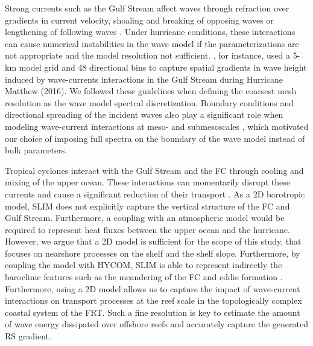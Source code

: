 Strong currents such as the Gulf Stream affect waves through refraction over gradients in current velocity, shoaling and breaking of opposing waves or lengthening of following waves \citep{hegermiller2019wave}. Under hurricane conditions, these interactions can cause numerical instabilities in the wave model if the parameterizations are not appropriate and the model resolution not sufficient. \cite{hegermiller2019wave}, for instance, used a 5-km model grid and 48 directional bins to capture spatial gradients in wave height induced by wave-currents interactions in the Gulf Stream during Hurricane Matthew (2016). We followed these guidelines when defining the coarsest mesh resolution as the wave model spectral discretization. Boundary conditions and directional spreading of the incident waves also play a significant role when modeling wave-current interactions at meso- and submesoscales \citep{villas2020wave}, which motivated our choice of imposing full spectra on the boundary of the wave model instead of bulk parameters.

Tropical cyclones interact with the Gulf Stream and the FC through cooling and mixing of the upper ocean. These interactions can momentarily disrupt these currents and cause a significant reduction of their transport \citep{oey2007hurricane,ezer2017observations,ezer2020long}. As a 2D barotropic model, SLIM does not explicitly capture the vertical structure of the FC and Gulf Stream. Furthermore, a coupling with an atmospheric model would be required to represent heat fluxes between the upper ocean and the hurricane. However, we argue that a 2D model is sufficient for the scope of this study, that focuses on nearshore processes on the shelf and the shelf slope. Furthermore, by coupling the model with HYCOM, SLIM is able to represent indirectly the baroclinic features such as the meandering of the FC and eddie formation \citep{frys2020fine}. Furthermore, using a 2D model allows us to capture the impact of wave-current interactions on transport processes at the reef scale in the topologically complex coastal system of the FRT. Such a fine resolution is key to estimate the amount of wave energy dissipated over offshore reefs and accurately capture the generated RS gradient.

